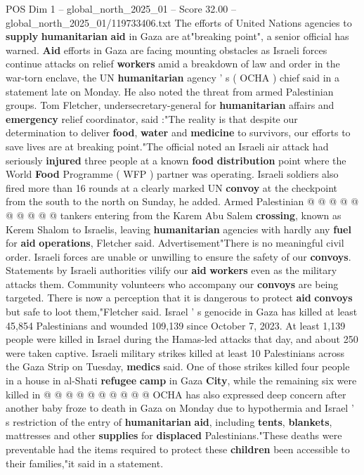 \begin{textsample}{POS Dim 1 – global\_north\_2025\_01 – Score 32.00 – global\_north\_2025\_01/119733406.txt}  \label{ex:f1_pos_366}
The efforts of United Nations agencies to \textbf{supply} \textbf{humanitarian} \textbf{aid} in Gaza are at"breaking point", a senior official has warned. \textbf{Aid} efforts in Gaza are facing mounting obstacles as Israeli forces continue attacks on relief \textbf{workers} amid a breakdown of law and order in the war-torn enclave, the UN \textbf{humanitarian} agency ' s ( OCHA ) chief said in a statement late on Monday.
He also noted the threat from armed Palestinian groups.
Tom Fletcher, undersecretary-general for \textbf{humanitarian} affairs and \textbf{emergency} relief coordinator, said :"The reality is that despite our determination to deliver \textbf{food}, \textbf{water} and \textbf{medicine} to survivors, our efforts to save lives are at breaking point."The official noted an Israeli air attack had seriously \textbf{injured} three people at a known \textbf{food} \textbf{distribution} point where the World \textbf{Food} Programme ( WFP ) partner was operating.
Israeli soldiers also fired more than 16 rounds at a clearly marked UN \textbf{convoy} at the checkpoint from the south to the north on Sunday, he added.
Armed Palestinian @ @ @ @ @ @ @ @ @ @ tankers entering from the Karem Abu Salem \textbf{crossing}, known as Kerem Shalom to Israelis, leaving \textbf{humanitarian} agencies with hardly any \textbf{fuel} for \textbf{aid} \textbf{operations}, Fletcher said.
Advertisement"There is no meaningful civil order.
Israeli forces are unable or unwilling to ensure the safety of our \textbf{convoys}.
Statements by Israeli authorities vilify our \textbf{aid} \textbf{workers} even as the military attacks them.
Community volunteers who accompany our \textbf{convoys} are being targeted.
There is now a perception that it is dangerous to protect \textbf{aid} \textbf{convoys} but safe to loot them,"Fletcher said.
Israel ' s genocide in Gaza has killed at least 45,854 Palestinians and wounded 109,139 since October 7, 2023.
At least 1,139 people were killed in Israel during the Hamas-led attacks that day, and about 250 were taken captive.
Israeli military strikes killed at least 10 Palestinians across the Gaza Strip on Tuesday, \textbf{medics} said.
One of those strikes killed four people in a house in al-Shati \textbf{refugee} \textbf{camp} in Gaza \textbf{City}, while the remaining six were killed in @ @ @ @ @ @ @ @ @ @ OCHA has also expressed deep concern after another baby froze to death in Gaza on Monday due to hypothermia and Israel ' s restriction of the entry of \textbf{humanitarian} \textbf{aid}, including \textbf{tents}, \textbf{blankets}, mattresses and other \textbf{supplies} for \textbf{displaced} Palestinians."These deaths were preventable had the items required to protect these \textbf{children} been accessible to their families,"it said in a statement.

\end{textsample}
